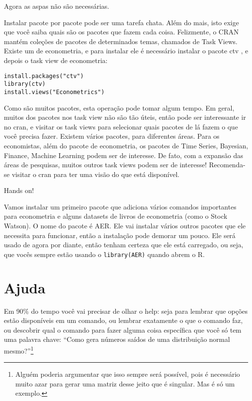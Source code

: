 \documentclass[]{book}
\let\rmarkdownfootnote\footnote%
\def\footnote{\protect\rmarkdownfootnote}
\begin{document}
Agora as aspas não são necessárias.

Instalar pacote por pacote pode ser uma tarefa chata. Além do mais, isto
exige que você saiba quais são os pacotes que fazem cada coisa.
Felizmente, o CRAN mantém coleções de pacotes de determinados temas,
chamados de Task Views. Existe um de econometria, e para instalar ele é
necessário instalar o pacote ctv , e depois o task view de econometria:

\begin{verbatim}
install.packages("ctv")
library(ctv)
install.views("Econometrics")
\end{verbatim}

Como são muitos pacotes, esta operação pode tomar algum tempo. Em geral,
muitos dos pacotes nos task view não são tão úteis, então pode ser
interessante ir no cran, e visitar os task views para selecionar quais
pacotes de lá fazem o que você precisa fazer. Existem vários pacotes,
para diferentes áreas. Para os economistas, além do pacote de
econometria, os pacotes de Time Series, Bayesian, Finance, Machine
Learning podem ser de interesse. De fato, com a expansão das áreas de
pesquisas, muitos outros task views podem ser de interesse! Recomenda-se
visitar o cran para ter uma visão do que está disponível.

Hands on!

Vamos instalar um primeiro pacote que adiciona vários comandos
importantes para econometria e alguns datasets de livros de econometria
(como o Stock Watson). O nome do pacote é AER. Ele vai instalar vários
outros pacotes que ele necessita para funcionar, então a instalação pode
demorar um pouco. Ele será usado de agora por diante, então tenham
certeza que ele está carregado, ou seja, que vocês sempre estão usando o
\texttt{library(AER)} quando abrem o R.

\section{Ajuda}\label{ajuda}

Em 90\% do tempo você vai precisar de olhar o help: seja para lembrar
que opções estão disponíveis em um comando, ou lembrar exatamente o que
o comando faz, ou descobrir qual o comando para fazer alguma coisa
específica que você só tem uma palavra chave: ``Como gera números saídos
de uma distribuição normal mesmo?''\footnote{Alguém poderia argumentar
  que isso sempre será possível, pois é necessário muito azar para gerar
  uma matriz desse jeito que é singular. Mas é só um exemplo.}
\end{document}
